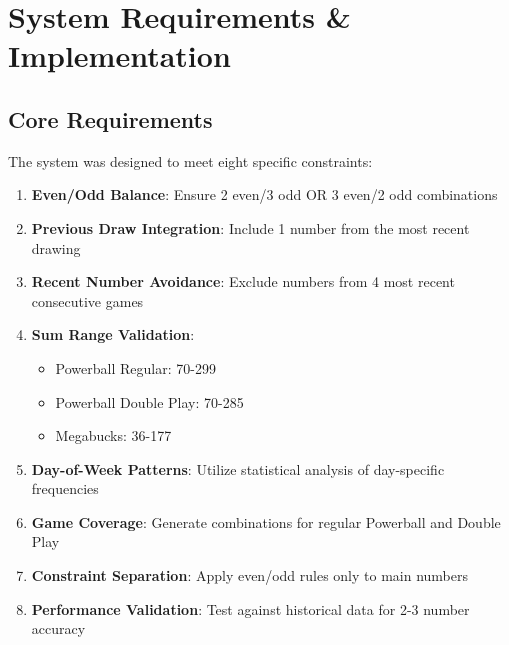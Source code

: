 \documentclass[12pt,a4paper]{article}
\begin{document}
\section{System Requirements \& Implementation}

\subsection{Core Requirements}
The system was designed to meet eight specific constraints:

\begin{enumerate}
    \item \textbf{Even/Odd Balance}: Ensure 2 even/3 odd OR 3 even/2 odd combinations
    \item \textbf{Previous Draw Integration}: Include 1 number from the most recent drawing
    \item \textbf{Recent Number Avoidance}: Exclude numbers from 4 most recent consecutive games
    \item \textbf{Sum Range Validation}: 
        \begin{itemize}
            \item Powerball Regular: 70-299
            \item Powerball Double Play: 70-285
            \item Megabucks: 36-177
        \end{itemize}
    \item \textbf{Day-of-Week Patterns}: Utilize statistical analysis of day-specific frequencies
    \item \textbf{Game Coverage}: Generate combinations for regular Powerball and Double Play
    \item \textbf{Constraint Separation}: Apply even/odd rules only to main numbers
    \item \textbf{Performance Validation}: Test against historical data for 2-3 number accuracy
\end{enumerate}
\end{document}
